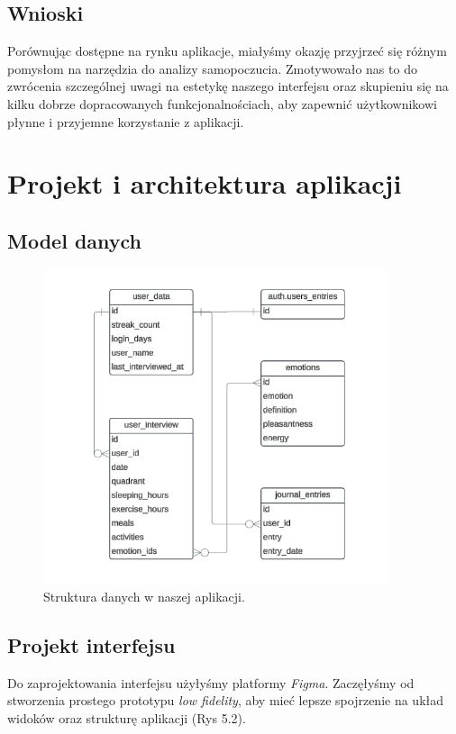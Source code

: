 \documentclass[inz, shortabstract]{iithesis}
\begin{document}
\section{Wnioski}
Porównując dostępne na rynku aplikacje, miałyśmy okazję przyjrzeć się różnym pomysłom na narzędzia do analizy samopoczucia. Zmotywowało nas to do zwrócenia szczególnej uwagi na estetykę naszego interfejsu oraz skupieniu się na kilku dobrze dopracowanych funkcjonalnościach, aby zapewnić użytkownikowi płynne i przyjemne korzystanie z aplikacji.


\chapter{Projekt i architektura aplikacji}

\section{Model danych}

\begin{figure}[!ht]
\centering
\includegraphics[width=0.9\textwidth]{modeldanych.jpg} 
\caption{Struktura danych w naszej aplikacji.}
\end{figure}

\section{Projekt interfejsu}

Do zaprojektowania interfejsu użyłyśmy platformy \textit{Figma}\cite{figma}. Zaczęłyśmy od stworzenia prostego prototypu \textit{low fidelity}, aby mieć lepsze spojrzenie na układ widoków oraz strukturę aplikacji (Rys 5.2).
\end{document}
